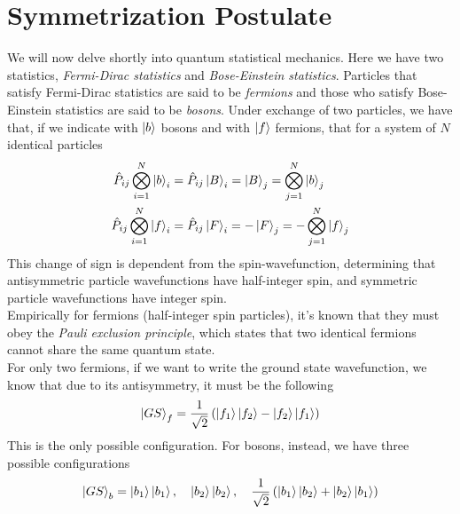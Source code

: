 \documentclass[../qm.tex]{subfiles}
\begin{document}
	\section{Symmetrization Postulate}
	We will now delve shortly into quantum statistical mechanics. Here we have two statistics, \textit{Fermi-Dirac statistics} and \textit{Bose-Einstein statistics}. Particles that satisfy Fermi-Dirac statistics are said to be \textit{fermions} and those who satisfy Bose-Einstein statistics are said to be \textit{bosons}. Under exchange of two particles, we have that, if we indicate with $\ket{b}$ bosons and with $\ket{f}$ fermions, that for a system of $N$ identical particles
	\begin{equation}
		\begin{aligned}
			\hat{P}_{ij}\bigotimes_{i=1}^N\ket{b}_i&=\hat{P}_{ij}\ket{B}_{i}=\ket{B}_j=\bigotimes_{j=1}^N\ket{b}_j\\
			\hat{P}_{ij}\bigotimes_{i=1}^N\ket{f}_i&=\hat{P}_{ij}\ket{F}_i=-\ket{F}_j=-\bigotimes_{j=1}^N\ket{f}_j
		\end{aligned}
		\label{eq:bosonfermionexchange}
	\end{equation}
	This change of sign is dependent from the spin-wavefunction, determining that antisymmetric particle wavefunctions have half-integer spin, and symmetric particle wavefunctions have integer spin.\\
	Empirically for fermions (half-integer spin particles), it's known that they must obey the \textit{Pauli exclusion principle}, which states that two identical fermions cannot share the same quantum state.\\
	For only two fermions, if we want to write the ground state wavefunction, we know that due to its antisymmetry, it must be the following
	\begin{equation}
		\ket{GS}_f=\frac{1}{\sqrt{2}}\left( \ket{f_1}\ket{f_2}-\ket{f_2}\ket{f_1} \right)
		\label{eq:fermiongswave}
	\end{equation}
	This is the only possible configuration. For bosons, instead, we have three possible configurations
	\begin{equation}
		\ket{GS}_b=\ket{b_1}\ket{b_1},\quad\ket{b_2}\ket{b_2},\quad\frac{1}{\sqrt{2}}\left( \ket{b_1}\ket{b_2}+\ket{b_2}\ket{b_1} \right)
		\label{eq:bosongswave}
	\end{equation}
\end{document}
